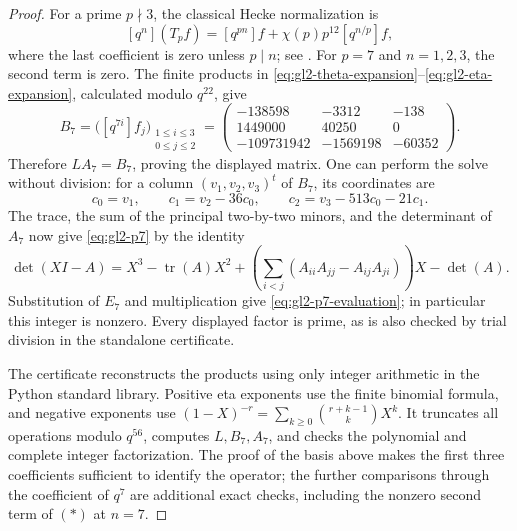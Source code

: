 \documentclass[11pt,a4paper]{article}
\theoremstyle{definition}
\begin{document}
\begin{proof}
For a prime $p\nmid3$, the classical Hecke normalization is
\[
 [q^n](T_pf)=[q^{pn}]f+\chi(p)p^{12}[q^{n/p}]f,
 \tag{*}
\]
where the last coefficient is zero unless $p\mid n$;
see \cite[\S8.2.2, p.~66]{K17RibetStein2011}.
For $p=7$ and $n=1,2,3$, the second term is zero.
The finite products in \eqref{eq:gl2-theta-expansion}--\eqref{eq:gl2-eta-expansion},
calculated modulo $q^{22}$, give
\[
 B_7=\bigl([q^{7i}]f_j\bigr)_{\substack{1\le i\le3\\0\le j\le2}}
 =\begin{pmatrix}
 -138598&-3312&-138\\
 1449000&40250&0\\
 -109731942&-1569198&-60352
 \end{pmatrix}.
\]
Therefore $LA_7=B_7$, proving the displayed matrix.
One can perform the solve without division: for a column $(v_1,v_2,v_3)^t$
of $B_7$, its coordinates are
\[
 c_0=v_1,\qquad c_1=v_2-36c_0,\qquad
 c_2=v_3-513c_0-21c_1.
\]
The trace, the sum of the principal two-by-two minors, and the determinant
of $A_7$ now give \eqref{eq:gl2-p7} by the identity
\[
 \det(XI-A)=X^3-\operatorname{tr}(A)X^2+
 \left(\sum_{i<j}(A_{ii}A_{jj}-A_{ij}A_{ji})\right)X-\det(A).
\]
Substitution of $E_7$ and multiplication give
\eqref{eq:gl2-p7-evaluation}; in particular this integer is nonzero.
Every displayed factor is prime, as is also checked by trial division in
the standalone certificate.

The certificate
 reconstructs the products using only
integer arithmetic in the Python standard library. Positive eta exponents
use the finite binomial formula, and negative exponents use
$(1-X)^{-r}=\sum_{k\ge0}\binom{r+k-1}{k}X^k$.
It truncates all operations modulo $q^{56}$, computes $L,B_7,A_7$,
and checks the polynomial and complete integer factorization.
The proof of the basis above makes the first three coefficients
sufficient to identify the operator; the further comparisons through
the coefficient of $q^7$ are additional exact checks, including the
nonzero second term of $(*)$ at $n=7$.
\end{proof}
\end{document}
